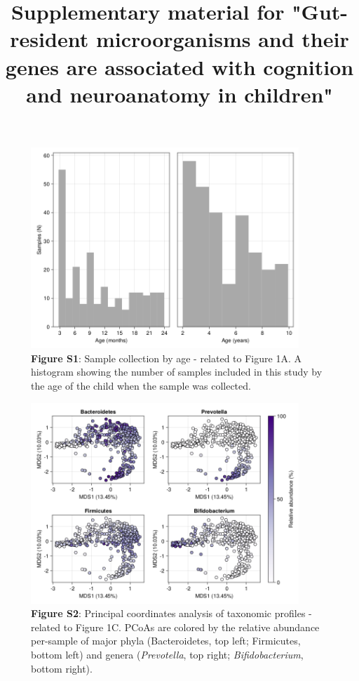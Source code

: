 \documentclass{article}
\title{Supplementary material for "Gut-resident microorganisms and their genes are associated with cognition and neuroanatomy in children"}
\begin{document}
\baselineskip24pt

\maketitle

\begin{figure}[h]
    \centering
    \includegraphics[width=0.9\textwidth]{assets/Supp_Figure1.png}
    \captionsetup{labelformat=empty}
    \caption{
        \textbf{Figure S1}: Sample collection by age - related to Figure 1A. A histogram showing the number of samples
        included in this study by the age of the child when the sample was collected.
    }
\end{figure}

\begin{figure}[h]
    \centering
    \includegraphics[width=0.9\textwidth]{assets/Supp_Figure2.png}
    \captionsetup{labelformat=empty}
    \caption{
        \textbf{Figure S2}: Principal coordinates analysis of taxonomic profiles - 
        related to Figure 1C. PCoAs are colored by the relative abundance per-sample
        of major phyla (Bacteroidetes, top left; Firmicutes, bottom left)
        and genera (\textit{Prevotella}, top right; \textit{Bifidobacterium}, bottom right).
    }
\end{figure}
\end{document}
